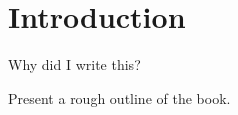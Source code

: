 \chapter{Introduction}
\label{chp:intro}

Why did I write this?

Present a rough outline of the book.


